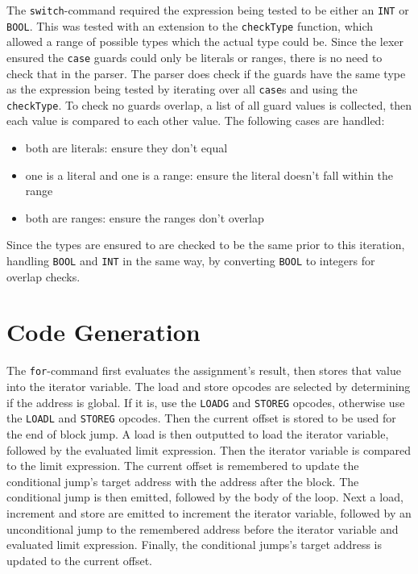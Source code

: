 \documentclass[11pt]{article}
\begin{document}
    The \texttt{switch}-command required the expression being tested to be either an \texttt{INT} or \texttt{BOOL}.
    This was tested with an extension to the \texttt{checkType} function, which allowed a range of possible types which
    the actual type could be.
    Since the lexer ensured the \texttt{case} guards could only be literals or ranges, there is no need to check that in
    the parser.
    The parser does check if the guards have the same type as the expression being tested by iterating over all
    \texttt{case}s and using the \texttt{checkType}.
    To check no guards overlap, a list of all guard values is collected, then each value is compared to each other
    value.
    The following cases are handled:
    \begin{itemize}
        \item both are literals: ensure they don't equal
        \item one is a literal and one is a range: ensure the literal doesn't fall within the range
        \item both are ranges: ensure the ranges don't overlap
    \end{itemize}
    Since the types are ensured to are checked to be the same prior to this iteration, handling \texttt{BOOL} and
    \texttt{INT} in the same way, by converting \texttt{BOOL} to integers for overlap checks.

    \section{Code Generation}\label{sec:code-generation}
    The \texttt{for}-command first evaluates the assignment's result, then stores that value into the iterator variable.
    The load and store opcodes are selected by determining if the address is global.
    If it is, use the \texttt{LOADG} and \texttt{STOREG} opcodes, otherwise use the \texttt{LOADL} and \texttt{STOREG}
    opcodes.
    Then the current offset is stored to be used for the end of block jump.
    A load is then outputted to load the iterator variable, followed by the evaluated limit expression.
    Then the iterator variable is compared to the limit expression.
    The current offset is remembered to update the conditional jump's target address with the address after the block.
    The conditional jump is then emitted, followed by the body of the loop.
    Next a load, increment and store are emitted to increment the iterator variable, followed by an unconditional jump
    to the remembered address before the iterator variable and evaluated limit expression.
    Finally, the conditional jumps's target address is updated to the current offset.
\end{document}
